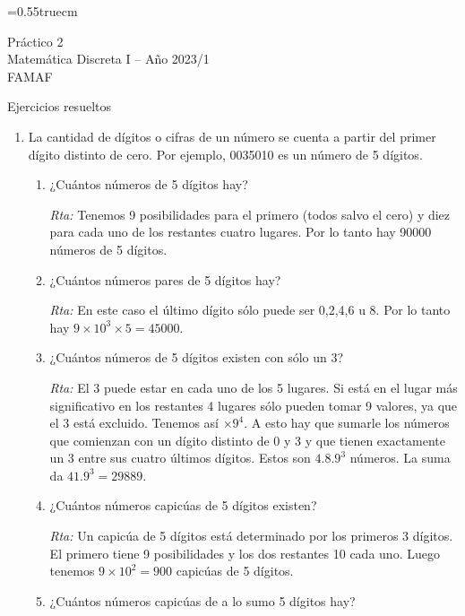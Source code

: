 \documentclass[a4paper,12pt,twoside,spanish,reqno]{amsbook}
\numberwithin{equation}{section}
\begin{document}
    \baselineskip=0.55truecm %
    
{\bf \begin{center} Práctico 2 \\ Matemática Discreta I -- Año 2023/1 \\ FAMAF \end{center}}

{\bf \begin{center} Ejercicios resueltos \end{center}}

\begin{enumerate}
\setlength\itemsep{1.1em}

\item  La cantidad de dígitos o cifras de un número se cuenta a partir del primer dígito
distinto de cero. Por ejemplo, 0035010 es un número de 5 dígitos.
\begin{enumerate}
\item ¿Cuántos números de 5 dígitos hay?

\textit{Rta:} Tenemos 9 posibilidades para el primero (todos salvo el cero) y diez para cada uno de los restantes cuatro lugares. Por lo tanto hay 90000 números de 5 dígitos.

\item ¿Cuántos números pares de 5 dígitos hay?

\textit{Rta:} En este caso el último dígito sólo puede ser 0,2,4,6 u 8. Por lo tanto hay $9\times 10^3\times 5= 45000$.

\item ¿Cuántos números de 5 dígitos existen con sólo un 3?

\noindent\textit{Rta:} El 3 puede estar en cada uno de los 5 lugares. Si está en el lugar más significativo en los restantes 4 lugares sólo pueden tomar 9 valores, ya que el 3 está excluido. Tenemos así $\times 9^4.$ A esto hay que sumarle los números que comienzan con un dígito distinto de 0 y 3 y que tienen exactamente un 3 entre sus cuatro últimos dígitos. Estos son $4.8.9^3$ números. La suma da $41.9^3=29889$.

\item ¿Cuántos números capicúas de 5 dígitos existen?

\textit{Rta:} Un capicúa de 5 dígitos está determinado por los primeros 3 dígitos. El primero tiene 9 posibilidades y los dos restantes 10 cada uno. Luego tenemos $9\times 10^2=900 $ capicúas de 5 dígitos.

\item ¿Cuántos números capicúas de a lo sumo 5 dígitos hay?


\end{enumerate}
\end{enumerate}
\end{document}

